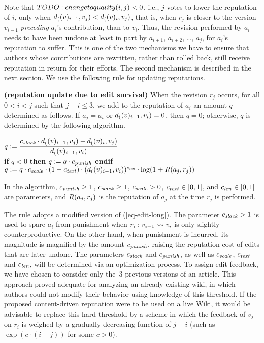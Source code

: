 Note that $TODO: change to quality(i,j) < 0$, i.e., $j$ votes to lower the reputation
of $i$, only when $d_{(}(v)_{i-1},v_j) < d_{(}(v)_{i},v_j)$, that is,
when $r_j$ is closer to the version $v_{i-1}$ {\em preceding\/}
$a_i$'s contribution, than to $v_i$.
Thus, the revision performed by $a_i$ needs to have been undone at
least in part by $a_{i+1}$, $a_{i+2}$, \ldots, $a_j$, for $a_i$'s
reputation to suffer.  
This is one of the two mechanisms we have to ensure that authors whose
contributions are rewritten, rather than rolled back, still receive
reputation in return for their efforts. 
The second mechanism is described in the next section.
We use the following rule for updating reputations. 

\begin{regola} \textbf{(reputation update due to edit survival)} \label{rule-edit}
  When the revision $r_j$ occurs, for all $0 < i < j$ such that 
  $j - i \leq 3$, we add to the reputation
  of $a_i$ an amount $q$ determined as follows. 
  If $a_j = a_i$ or $d_{(}(v)_{i-1},v_i) = 0$, then $q=0$; otherwise,
  $q$ is determined by the following algorithm.
  \begin{tabbing}
  $\displaystyle q := \frac{{c_{{\text{\textit{slack}}}}} \cdot d_{(}(v)_{i-1}, v_j) 
    - d_{(}(v)_i, v_j)}{d_{(}(v)_{i-1}, v_i)}$ \\[1ex]
  \textbf{if} $q < 0$ \textbf{then} $q := q \cdot {c_{{\text{\textit{punish}}}}}$ \textbf{endif} \\[1ex]
  $q := q \cdot {c_{{\text{\textit{scale}}}}} \cdot (1 - {c_{{\text{\textit{text}}}}}) \cdot 
        (d_{(}(v)_{i-1}, v_i))^{c_{{\text{\textit{len}}}}} \cdot \log(1 + R(a_j,r_j))$
  \end{tabbing}
  In the algorithm, ${c_{{\text{\textit{punish}}}}} \geq 1$, ${c_{{\text{\textit{slack}}}}} \geq 1$, ${c_{{\text{\textit{scale}}}}} > 0$, 
  ${c_{{\text{\textit{text}}}}} \in [0,1]$, and ${c_{{\text{\textit{len}}}}} \in [0,1]$ are parameters,
  and $R(a_j,r_j)$ is the reputation of $a_j$ at the time
  $r_j$ is performed.
\end{regola}

\noindent
The rule adopts a modified version of (\ref{eq-edit-long}).
The parameter ${c_{{\text{\textit{slack}}}}} > 1$ is used to spare $a_i$ from punishment when
$r_i: v_{i-1} \rightsquigarrow v_i$ is only slightly
counterproductive.
On the other hand, when punishment is incurred, its magnitude is
magnified by the amount ${c_{{\text{\textit{punish}}}}}$, raising the reputation cost of
edits that are later undone. 
The parameters ${c_{{\text{\textit{slack}}}}}$ and ${c_{{\text{\textit{punish}}}}}$, as well as ${c_{{\text{\textit{scale}}}}}$,
${c_{{\text{\textit{text}}}}}$ and ${c_{{\text{\textit{len}}}}}$, will be determined via an optimization
process. 
To assign edit feedback, we have chosen to consider only
the~3 previous versions of an article. 
This approach proved adequate for analyzing an already-existing wiki,
in which authors could not modify their behavior using knowledge of
this threshold. 
If the proposed content-driven reputation were to be used on a live
Wiki, it would be advisable to replace this hard threshold by a scheme
in which the feedback of $v_j$ on $r_i$ is weighed by a gradually
decreasing function of $j-i$ (such as $\exp(c \cdot (i-j))$ for some
$c > 0$). 


